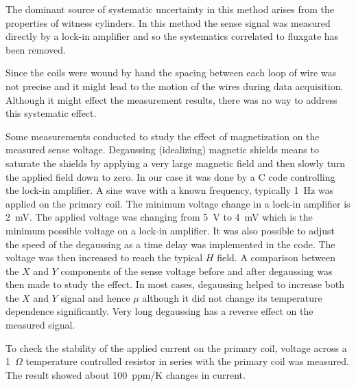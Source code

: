 


The dominant source of systematic uncertainty in this method arises
from the properties of witness cylinders. 
In this method the sense signal was measured directly by a lock-in amplifier and so the systematics correlated to fluxgate has been removed.


Since the coils were wound by hand the spacing between each loop of wire was not precise and it might lead to the motion of the wires during data acquisition. Although it might effect the measurement results, there was no way to address this systematic effect.


Some measurements conducted to study the effect of magnetization on the measured sense voltage. Degaussing
(idealizing) magnetic shields means to saturate the shields by
applying a very large magnetic field and then slowly turn the
applied field down to zero. In our case it was done by a C code controlling the lock-in amplifier. A sine wave with a known frequency, typically 1~Hz was applied on the primary coil. The minimum voltage change in a lock-in amplifier is 2~mV. The applied voltage was changing from 5~V to 4~mV which is the minimum possible voltage on a lock-in amplifier. It was also possible to adjust the speed of the degaussing as a time delay was implemented in the code.
The voltage was then increased to reach the typical $H$ field.
A comparison between the $X$ and $Y$ components of the sense voltage before and after degaussing was then made to study the effect.
In most cases, degaussing helped to
increase both the $X$ and $Y$ signal and hence $\mu$ although it did not change its temperature dependence significantly. Very long degaussing has a reverse effect on the measured signal.


To check the stability of the applied current on the primary coil, voltage across a 1~$\Omega$ temperature controlled resistor in series with the primary coil was measured. The result showed about 100~ppm/K changes in current.

